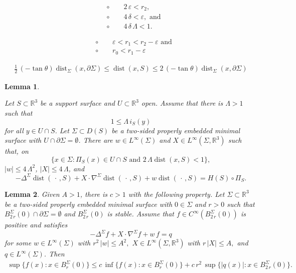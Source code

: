\documentclass[10pt,a4paper]{amsart}
\newtheorem{lem}{Lemma}
\begin{document}
\begin{equation} \label{epsilon, delta} 
\begin{aligned}
	&\circ \qquad 2\,\varepsilon<r_2,\\
	&\circ\qquad 4\,\delta<\varepsilon,\text{ and}\\
	&\circ\qquad 4\,\delta\,\Lambda<1.
\end{aligned}
\end{equation} 

\begin{equation} \label{r0, r1}
	\begin{aligned} 
&\circ \qquad\varepsilon<r_1<r_2-\varepsilon\text{ and}\\
&\circ \qquad r_0<r_1-\varepsilon
	\end{aligned} 
\end{equation}

\begin{align} \label{assumption 0}
	\frac{1}{2}\,(-\tan\theta)\operatorname{dist}_\Sigma(x, \partial \Sigma)\leq \operatorname{dist}(x,S)\leq 2\,(-\tan\theta)\operatorname{dist}_\Sigma(x, \partial \Sigma)
\end{align}

	\begin{lem} \label{distance super harmonic}
		

 Let $S\subset \mathbb{R}^3$ be a support surface and  
$U\subset \mathbb{R}^3$  open. Assume that there is $\Lambda>1$ such that 
$$
1\leq \Lambda\,i_S(y)
$$
for all $y\in U\cap S$. Let $\Sigma\subset D(S)$ be a two-sided properly embedded minimal surface with  $U\cap \partial \Sigma=\emptyset$.  There are $w\in L^\infty(\Sigma)$ and $X\in L^\infty(\Sigma,\mathbb{R}^3)$ such that, on $$\{x\in \Sigma:\Pi_S(x)\in U\cap S\text{ and }2\,\Lambda\operatorname{dist}(x,S)<1\},$$ $|w|\leq 4\,\Lambda^2$, $|X|\leq 4\,\Lambda$,  and
		$$
		-\Delta^\Sigma \operatorname{dist}(\,\cdot\,,S)+X\cdot \nabla^\Sigma \operatorname{dist}(\,\cdot\,,S)+w\operatorname{dist}(\,\cdot\,,S)=H(S)\circ \Pi_S.
		$$ 
	\end{lem}

\begin{lem} \label{harnack inequality}
	Given $A>1$, there is $c>1$ with the following property. Let  $\Sigma\subset \mathbb{R}^3$ be a two-sided properly embedded minimal surface with $0\in  \Sigma$ and $r>0$ such that  $B^\Sigma_{2\,r}(0)\cap \partial \Sigma=\emptyset$ and  $B^\Sigma_{2\,r}(0)$ is stable.  Assume that $f\in C^\infty(B^\Sigma_{2\,r}(0))$ is positive and satisfies
	$$-\Delta^\Sigma f+X\cdot \nabla^\Sigma f+w\,f=q$$
	for some $w\in L^\infty(\Sigma)$ with $r^2\,|w|\leq A^2,$ $X\in L^\infty(\Sigma,\mathbb{R}^3)$  with $r\,|X|\leq A,$ and $q\in L^\infty(\Sigma)$.
	 Then 
	\begin{align}
		\sup\{f(x):x\in B^\Sigma_{r}(0)\}\leq c\,\inf \{f(x):x\in B^\Sigma_{r}(0)\}+c\,r^2\,\sup\{|q(x)|:x\in B^\Sigma_{2\,r}(0)\}.
	\end{align} 
\end{lem}
\end{document}
